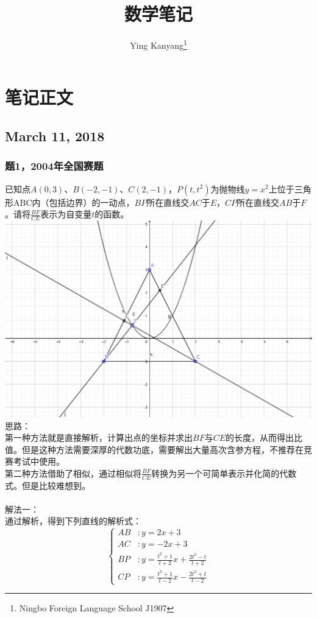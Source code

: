 \documentclass[12pt]{article}
\title{数学笔记}
\author{Ying Kanyang\thanks{Ningbo Foreign Language School J1907}}
\begin{document}
  \maketitle{}
  \tableofcontents{}
  \newpage{}
  \section{笔记正文}
		\subsection{March 11, 2018}
			\subsubsection{题1，2004年全国赛题}
			已知点$A(0,3)$、$B(-2,-1)$、$C(2,-1)$，$P(t,t^{2})$为抛物线$y=x^{2}$上位于三角形ABC内（包括边界）的一动点，$BP$所在直线交$AC$于$E$，$CP$所在直线交$AB$于$F$。请将$\frac{BF}{CE}$表示为自变量$t$的函数。\\
			\includegraphics[scale=0.4]{pictures/2018-03-11-1-2004全国赛.png}
			\\
			思路：\\
			第一种方法就是直接解析，计算出点的坐标并求出$BF$与$CE$的长度，从而得出比值。但是这种方法需要深厚的代数功底，需要解出大量高次含参方程，不推荐在竞赛考试中使用。\\
			第二种方法借助了相似，通过相似将$\frac{BF}{CE}$转换为另一个可简单表示并化简的代数式。但是比较难想到。\\
			\\
			解法一：\\
			通过解析，得到下列直线的解析式：
			\begin{equation}
				\left\{
				\begin{aligned}
					AB&:y=2x+3\\
					AC&:y=-2x+3\\
					BP&:y=\frac{t^2+1}{t+2}x+\frac{2 t^2-t}{t+2}\\
					CP&:y=\frac{t^2+1}{t-2}x-\frac{2 t^2+t}{t-2}
				\end{aligned}
				\right.
			\end{equation}
\end{document}
